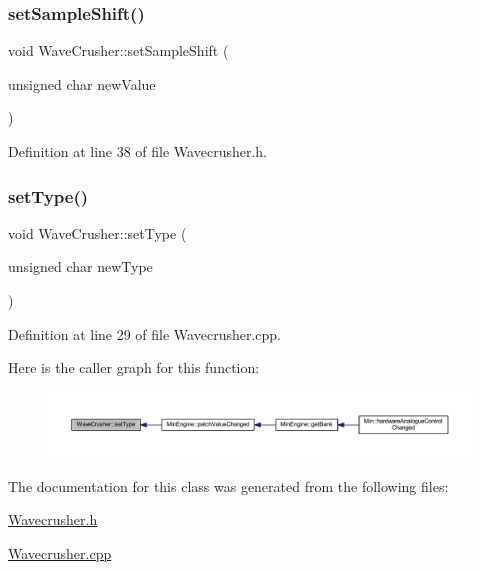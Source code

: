 \subsubsection{\texorpdfstring{set\+Sample\+Shift()}{setSampleShift()}}
{\footnotesize\ttfamily void Wave\+Crusher\+::set\+Sample\+Shift (\begin{DoxyParamCaption}\item[{unsigned char}]{new\+Value }\end{DoxyParamCaption})\hspace{0.3cm}{\ttfamily [inline]}}



Definition at line 38 of file Wavecrusher.\+h.

\mbox{\label{class_wave_crusher_a61ba1c5b0cf0c3bd1f112de317f2deb3}} 
\subsubsection{\texorpdfstring{set\+Type()}{setType()}}
{\footnotesize\ttfamily void Wave\+Crusher\+::set\+Type (\begin{DoxyParamCaption}\item[{unsigned char}]{new\+Type }\end{DoxyParamCaption})}



Definition at line 29 of file Wavecrusher.\+cpp.

Here is the caller graph for this function\+:
\nopagebreak
\begin{figure}[H]
\begin{center}
\leavevmode
\includegraphics[width=350pt]{df/d70/class_wave_crusher_a61ba1c5b0cf0c3bd1f112de317f2deb3_icgraph}
\end{center}
\end{figure}


The documentation for this class was generated from the following files\+:\begin{DoxyCompactItemize}
\item 
\hyperlink{_wavecrusher_8h}{Wavecrusher.\+h}\item 
\hyperlink{_wavecrusher_8cpp}{Wavecrusher.\+cpp}\end{DoxyCompactItemize}

